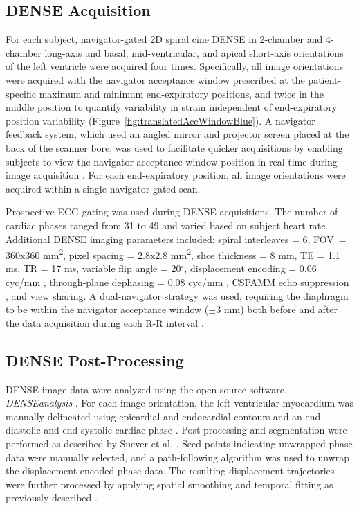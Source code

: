 \subsection{DENSE Acquisition}
	For each subject, navigator-gated 2D spiral cine DENSE in 2-chamber and 4-chamber long-axis and basal, mid-ventricular, and apical short-axis orientations of the left ventricle were acquired four times. Specifically, all image orientations were acquired with the navigator acceptance window prescribed at the patient-specific maximum and minimum end-expiratory positions, and twice in the middle position to quantify variability in strain independent of end-expiratory position variability (Figure~\ref{fig:translatedAccWindowBlue}). A navigator feedback system, which used an angled mirror and projector screen placed at the back of the scanner bore, was used to facilitate quicker acquisitions by enabling subjects to view the navigator acceptance window position in real-time during image acquisition \cite{Hamlet2016a}. For each end-expiratory position, all image orientations were acquired within a single navigator-gated scan.
	
	Prospective ECG gating was used during DENSE acquisitions. The number of cardiac phases ranged from 31 to 49 and varied based on subject heart rate. Additional DENSE imaging parameters included: spiral interleaves = 6, FOV~=~ 360x360 mm\textsuperscript{2}, pixel spacing = 2.8x2.8 mm\textsuperscript{2}, slice thickness = 8 mm, TE = 1.1 ms, TR = 17 ms, variable flip angle = 20$^{\circ}$, displacement encoding = 0.06 cyc/mm \cite{Wehner2015a}, through-plane dephasing = 0.08 cyc/mm \cite{Zhong2006a}, CSPAMM echo suppression \cite{Kim2004}, and view sharing. A dual-navigator strategy was used, requiring the diaphragm to be within the navigator acceptance window ($\pm$3 mm) both before and after the data acquisition during each R-R interval \cite{Hamlet2016}.
	
\subsection{DENSE Post-Processing}
	DENSE image data were analyzed using the open-source software, \textit{DENSEanalysis} \cite{Gilliam2016a}. For each image orientation, the left ventricular myocardium was manually delineated using epicardial and endocardial contours and an end-diastolic and end-systolic cardiac phase \cite{Suever2014}. Post-processing and segmentation were performed as described by Suever et al. \cite{Suever2014}. Seed points indicating unwrapped phase data were manually selected, and a path-following algorithm was used to unwrap the displacement-encoded phase data. The resulting displacement trajectories were further processed by applying spatial smoothing and temporal fitting as previously described \cite{Spottiswoode2007}.
	
